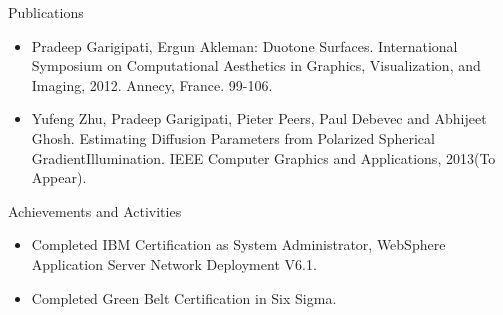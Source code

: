 \documentclass[11pt,oneside]{article}
\newenvironment{ressection}[1]{
  \vspace{4pt}
  {\fontfamily{phv}\selectfont\Large#1}
  \begin{itemize}
  \vspace{3pt}
}{
  \end{itemize}
}
\newcommand{\resitem}[1]{
  \vspace{-4pt}
  \item \begin{flushleft} #1 \end{flushleft}
}
\begin{document}
\begin{ressection}{Publications}
	\resitem{Pradeep Garigipati, Ergun Akleman: Duotone Surfaces. International Symposium on Computational Aesthetics in Graphics, Visualization, and Imaging, 2012. Annecy, France. 99-106.}
	\resitem{Yufeng Zhu, Pradeep Garigipati, Pieter Peers, Paul Debevec and Abhijeet Ghosh. Estimating Diffusion Parameters from Polarized Spherical GradientIllumination. IEEE Computer Graphics and Applications, 2013(To Appear).}
\end{ressection}



\begin{ressection}{Achievements and Activities}
  
  \resitem{Completed IBM Certification as System Administrator, WebSphere Application Server Network Deployment V6.1.}
  \resitem{Completed Green Belt Certification in Six Sigma.}
  
\end{ressection}
\end{document}
